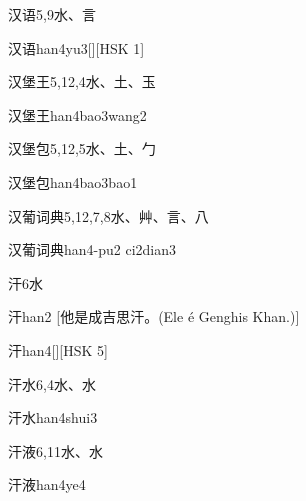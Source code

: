 \begin{entry}{汉语}{5,9}{⽔、⾔}
  \begin{phonetics}{汉语}{han4yu3}[][HSK 1]
  \end{phonetics}
\end{entry}

\begin{entry}{汉堡王}{5,12,4}{⽔、⼟、⽟}
  \begin{phonetics}{汉堡王}{han4bao3wang2}
  \end{phonetics}
\end{entry}

\begin{entry}{汉堡包}{5,12,5}{⽔、⼟、⼓}
  \begin{phonetics}{汉堡包}{han4bao3bao1}
  \end{phonetics}
\end{entry}

\begin{entry}{汉葡词典}{5,12,7,8}{⽔、⾋、⾔、⼋}
  \begin{phonetics}{汉葡词典}{han4-pu2 ci2dian3}
  \end{phonetics}
\end{entry}

\begin{entry}{汗}{6}{⽔}
  \begin{phonetics}{汗}{han2}
    [他是成吉思汗。(Ele é Genghis Khan.)]
  \end{phonetics}
  \begin{phonetics}{汗}{han4}[][HSK 5]
  \end{phonetics}
\end{entry}

\begin{entry}{汗水}{6,4}{⽔、⽔}
  \begin{phonetics}{汗水}{han4shui3}
  \end{phonetics}
\end{entry}

\begin{entry}{汗液}{6,11}{⽔、⽔}
  \begin{phonetics}{汗液}{han4ye4}
  \end{phonetics}
\end{entry}

